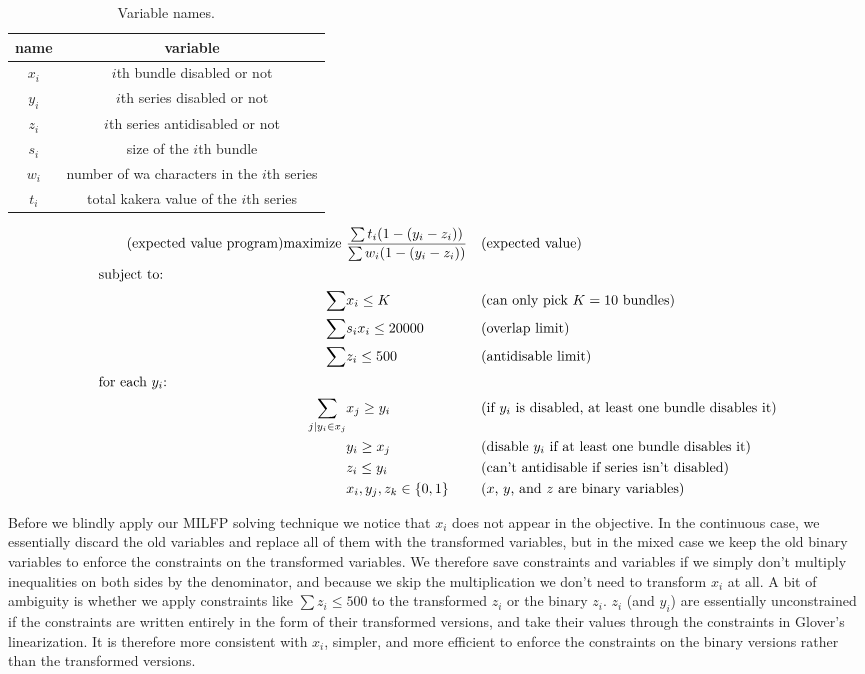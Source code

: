 \documentclass[11pt, oneside]{article}
\theoremstyle{plain}
\theoremstyle{definition}
\begin{document}
\begin{table}[h!]
  \centering
  \begin{tabular}{|c|c|}
    \hline
    name & variable \\
    \hline \hline
    \( x_i \) & \( i \)th bundle disabled or not \\
    \( y_i \) & \( i \)th series disabled or not \\
    \( z_i \) & \( i \)th series antidisabled or not \\  
    \( s_i \) & size of the \( i \)th bundle \\
    \( w_i \) & number of wa characters in the \( i \)th series \\
    \( t_i \) & total kakera value of the \( i \)th series \\ \hline
  \end{tabular}
  \caption{Variable names.}
\end{table}

\begin{align*}
  \tag{expected value program} \label{eq:expected_value}
  \text{maximize } &\frac{\sum t_i (1 - (y_i - z_i))}{\sum w_i (1 - (y_i - z_i))} 
  && \text{(expected value)} \\
  \shortintertext{subject to:}
  \sum& x_i \leq K && \text{(can only pick \( K = 10 \) bundles)} \\
  \sum& s_i x_i \leq 20000 && \text{(overlap limit)} \\
  \sum& z_i \leq 500 && \text{(antidisable limit)} \\
  \shortintertext{for each \( y_i \):}
  \sum_{j | y_i \in x_j}& x_j \geq y_i && 
  \text{(if \( y_i \) is disabled, at least one bundle disables it)} \\
                        & y_i \geq x_j && 
  \text{(disable \( y_i \) if at least one bundle disables it)} \\
                        & z_i \leq y_i &&
  \text{(can't antidisable if series isn't disabled)} \\
  &x_i, y_j, z_k \in \{0, 1\} && \text{(\( x \), \( y \), and \( z \) are binary variables)}
\end{align*}

Before we blindly apply our MILFP solving technique we notice that \( x_i
\) does not appear in the objective. In the continuous case, we essentially
discard the old variables and replace all of them with the transformed
variables, but in the mixed case we keep the old binary variables to enforce
the constraints on the transformed variables. We therefore save constraints
and variables if we simply don't multiply inequalities on both sides by the
denominator, and because we skip the multiplication we don't need to transform
\( x_i \) at all. A bit of ambiguity is whether we apply constraints like \(
\sum z_i \leq 500 \) to the transformed \( z_i \) or the binary \( z_i \). \(
z_i \) (and \( y_i \)) are essentially unconstrained if the constraints are
written entirely in the form of their transformed versions, and take their
values through the constraints in Glover's linearization. It is therefore
more consistent with \( x_i \), simpler, and more efficient to enforce the
constraints on the binary versions rather than the transformed versions.
\end{document}
